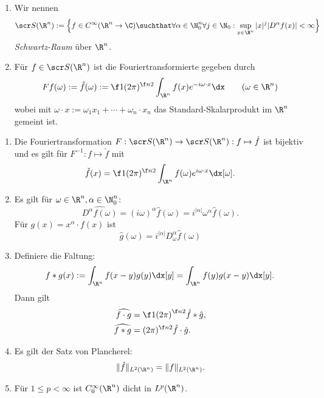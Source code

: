 \begin{df} \label{4.29}
	\begin{enumerate}[1)]
		\item
			Wir nennen
			\[
				\scr S(\R^n) := \Big\{ f \in C^\infty(\R^n \to \C) \suchthat \forall \alpha \in \N_0^n \forall j\in \N_0 : \sup_{x\in \R^n} |x|^j |D^{\alpha} f(x)| < \infty \Big\}
			\]
			\emph{Schwartz-Raum} über $\R^n$.
		\item
			Für $f \in \scr S(\R^n)$ ist die Fouriertransformierte gegeben durch
			\[
				F f(\omega) := \hat f(\omega) := \f 1{(2\pi)^{\f n2}} \int_{\R^n} f(x) e^{-i \omega \cdot x} \dx
				\qquad (\omega \in \R^n)
			\]
			wobei mit $\omega \cdot x := \omega_1 x_1 + \dotsb + \omega_n \cdot x_n$ das Standard-Skalarprodukt im $\R^n$ gemeint ist.
	\end{enumerate}
\end{df}

\begin{st} \label{4.30}
	\begin{enumerate}[1)]
		\item
			Die Fouriertransformation $F: \scr S(\R^n) \to \scr S(\R^n) : f \mapsto \hat f$ ist bijektiv und es gilt für $F^{-1} : f \mapsto \check f$ mit
			\[
				\check f (x) = \f 1{(2\pi)^{\f n2}} \int_{\R^n} f(\omega) e^{i \omega \cdot x} \dx[\omega].
			\]
		\item
			Es gilt für $\omega \in \R^n, \alpha \in \N_0^n$:
			\[
				\widehat{D^\alpha f(\omega)} = (i\omega)^\alpha \hat f(\omega) = i^{|\alpha|} \omega^\alpha \hat f(\omega).
			\]
			Für $g(x) = x^\alpha \cdot f(x)$ ist
			\[
				\hat g(\omega) = i^{|\alpha|} D_\omega^\alpha \hat f (\omega)
			\]
		\item
			Definiere die Faltung:
			\[
				f \ast g(x) := \int_{\R^n} f(x-y) g(y) \dx[y] = \int_{\R^n} f(y) g(x-y) \dx[y].
			\]
			Dann gilt
			\begin{align*}
				\widehat{f\cdot g} &=  \f 1{(2\pi)}^{\f n2 } \hat f \ast \hat g, \\
				\widehat{f\ast g} &= (2\pi)^{\f n2} \hat f \cdot \hat g.
			\end{align*}
		\item
			Es gilt der Satz von Plancherel:
			\[
				\|\hat f\|_{L^2(\R^n)} = \|f\|_{L^2(\R^n)}.
			\]
		\item
			Für $1 \le p < \infty$ ist $C_0^\infty(\R^n)$ dicht in $L^p(\R^n)$.
	\end{enumerate}
\end{st}

